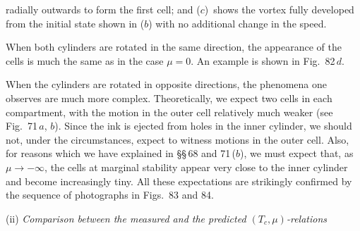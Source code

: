 
\noindent radially outwards to form the first cell; and ($c$)~shows the vortex fully
developed from the initial state shown in ($b$) with no additional change
in the speed.

When both cylinders are rotated in the same direction, the appearance
of the cells is much the same as in the case $\mu = 0$.  An example is shown
in Fig.~82\,$d$.

When the cylinders are rotated in opposite directions, the phenomena
one observes are much more complex.  Theoretically, we expect two cells
in each compartment, with the motion in the outer cell relatively much
weaker (see Fig.~71\,$a$, $b$).  Since the ink is ejected from holes in the inner
cylinder, we should not, under the circumstances, expect to witness
motions in the outer cell.  Also, for reasons which we have explained in
\S\S\,68 and 71\,($b$), we must expect that, as $\mu \to -\infty$, the cells at marginal
stability appear very close to the inner cylinder and become increasingly
tiny.  All these expectations are strikingly confirmed by the sequence of
photographs in Figs.~83 and 84.




\medskip
\noindent (ii) \textit{Comparison between the measured and the predicted $(T_c, \mu)$-relations}

